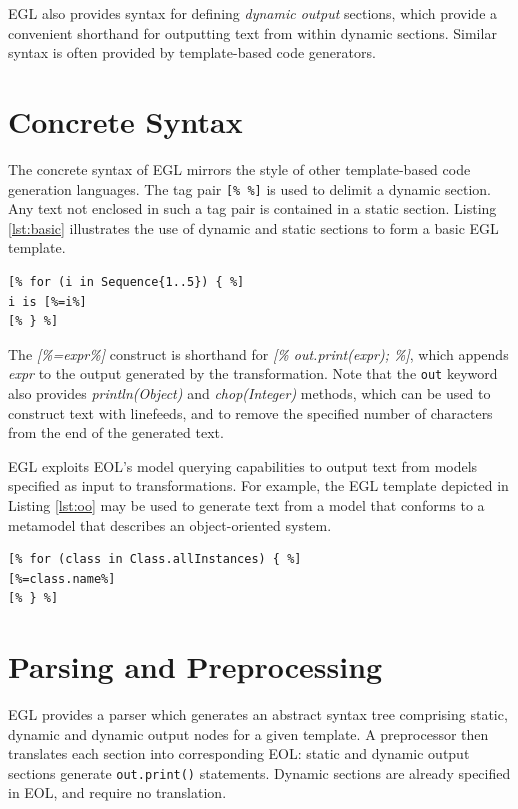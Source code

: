 EGL also provides syntax for defining \textit{dynamic output}
sections, which provide a convenient shorthand for outputting text
from within dynamic sections. Similar syntax is often provided by
template-based code generators.

\section{Concrete Syntax}
\label{concretesyntax}

The concrete syntax of EGL mirrors the style of other
template-based code generation languages. The tag pair \verb|[% %]| is
used to delimit a dynamic section. Any text not enclosed in such a tag
pair is contained in a static section. Listing
\ref{lst:basic} illustrates the use of dynamic and static sections to
form a basic EGL template.

\begin{lstlisting}[basicstyle=\ttfamily\footnotesize, tabsize=2, flexiblecolumns=true, caption=A basic EGL template., label=lst:basic]
[% for (i in Sequence{1..5}) { %]
i is [%=i%]
[% } %]
\end{lstlisting}

The \emph{[\%=expr\%]} construct is shorthand for \emph{[\%
  out.print(expr); \%]}, which appends \emph{expr} to the output
generated by the transformation. Note that the \verb|out| keyword also
provides \emph{println(Object)} and \emph{chop(Integer)} methods, which
can be used to construct text with linefeeds, and to remove the
specified number of characters from the end of the generated text.

EGL exploits EOL's model querying capabilities to output text from
models specified as input to transformations. For example, the EGL
template depicted in Listing \ref{lst:oo} may be used to generate text
from a model that conforms to a metamodel that describes an
object-oriented system.

\begin{lstlisting}[basicstyle=\ttfamily\footnotesize, tabsize=2, flexiblecolumns=true, caption=Generating the name of each Class contained in an input model., label=lst:oo]
[% for (class in Class.allInstances) { %]
[%=class.name%]
[% } %]
\end{lstlisting}

\section{Parsing and Preprocessing}
EGL provides a parser which generates an abstract syntax tree comprising static, dynamic and dynamic output nodes for a given template. A preprocessor then translates each section into corresponding EOL: static and dynamic output sections generate \verb|out.print()| statements. Dynamic sections are already specified in EOL, and require no translation.

